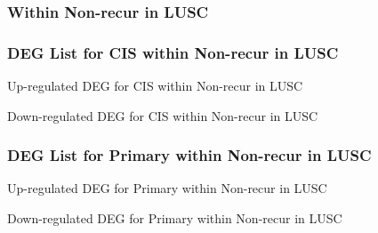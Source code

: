 \documentclass{beamer}
\begin{document}
    \subsubsection{Within Non-recur in LUSC}
    \begin{frame}
        \frametitle{DEG List for CIS within Non-recur in LUSC}

        \begin{table}
            \caption{Up-regulated DEG for CIS within Non-recur in LUSC}
            
        \end{table}

        \begin{table}
            \caption{Down-regulated DEG for CIS within Non-recur in LUSC}
            
        \end{table}
    \end{frame}

    \begin{frame}
        \frametitle{DEG List for Primary within Non-recur in LUSC}

        \begin{table}
            \caption{Up-regulated DEG for Primary within Non-recur in LUSC}
            
        \end{table}

        \begin{table}
            \caption{Down-regulated DEG for Primary within Non-recur in LUSC}
            
        \end{table}
    \end{frame}
\end{document}
